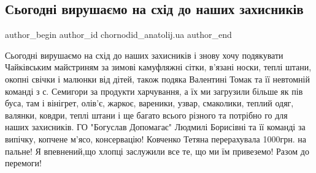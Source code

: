  
 
 
 
 
 
\subsection{Сьогодні вирушаємо на схід до наших захисників}
\label{sec:28_12_2022.fb.chornodid_anatolij.ua.1.sxid}
 
\ifcmt
 author_begin
   author_id chornodid_anatolij.ua
 author_end
\fi

Сьогодні вирушаємо на схід до наших захисників і знову хочу подякувати
Чайківським майстриням за зимові камуфляжні сітки, в'язані носки,  теплі штани,
окопні свічки і малюнки від дітей, також подяка Валентині Томак та її невтомній
команді з с. Семигори за продукти харчування, а їх ми загрузили більше як пів
буса, там і вінігрет, олів'є, жаркоє, вареники, узвар, смаколики, теплий одяг,
валянки, ковдри, теплі штани і ще багато всього різного та потрібно го для
наших захисників.  ГО "Богуслав Допомагає" Людмилі Борисівні та її команді за
випічку, копчене м'ясо, консервацію! Ковченко Тетяна перерахувала 1000грн. на
пальне! Я впевнений,що хлопці заслужили все те, що ми їм привеземо! Разом до
перемоги!

